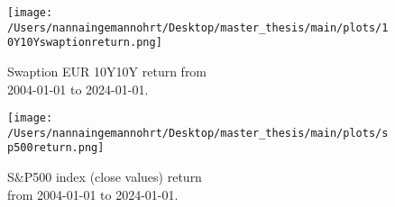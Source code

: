 \begin{figure}[h]
    \centering
    \begin{minipage}{0.5\textwidth}
        \texttt{[image: /Users/nannaingemannohrt/Desktop/master\_thesis/main/plots/10Y10Yswaptionreturn.png]}
        \caption{Swaption EUR 10Y10Y return from  \\ 2004-01-01 to 2024-01-01.}
        \label{10Y10Y return}
    \end{minipage}\hfill 
    \begin{minipage}{0.5\textwidth}
        \texttt{[image: /Users/nannaingemannohrt/Desktop/master\_thesis/main/plots/sp500return.png]}
        \caption{S$\&$P500 index (close values) return  \\ from 2004-01-01 to 2024-01-01.}
        \label{sp500 return}
    \end{minipage}
\end{figure}